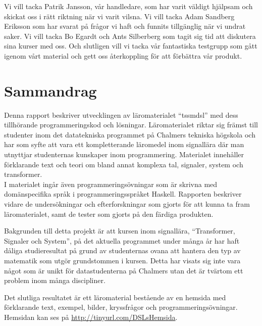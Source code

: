 \documentclass[12pt,a4paper,twoside,openright]{article}
\begin{document}
Vi vill tacka Patrik Jansson, vår handledare, som har varit väldigt
hjälpsam och skickat oss i rätt riktning när vi varit vilsna. Vi vill
tacka Adam Sandberg Eriksson som har svarat på frågor vi haft och
funnits tillgänglig när vi undrat saker. Vi vill tacka Bo Egardt och
Ants Silberberg som tagit sig tid att diskutera sina kurser med
oss. Och slutligen vill vi tacka vår fantastiska testgrupp som gått
igenom vårt material och gett oss återkoppling för att förbättra vår
produkt.

\newpage

\thispagestyle{plain}

\section*{Sammandrag}
Denna rapport beskriver utvecklingen av läromaterialet ``\gls{tssmdsl}''
med dess tillhörande programmeringskod och lösningar. Läromaterialet
riktar sig främst till studenter inom det datatekniska programmet på
Chalmers tekniska högskola och har som syfte att vara ett
kompletterande läromedel inom signallära där man utnyttjar
studenternas kunskaper inom programmering. Materialet innehåller
förklarande text och teori om bland annat komplexa tal, signaler,
system och transformer. \\I materialet ingår även programmeringsövningar
som är skrivna med domänspecifika språk i programmeringsspråket
\gls{Haskell}. Rapporten beskriver vidare de undersökningar och efterforskningar som
gjorts för att kunna ta fram läromaterialet, samt de tester som
gjorts på den färdiga produkten.

Bakgrunden till detta projekt är att kursen inom signallära,
``Transformer, Signaler och System'', på det aktuella programmet under
många år har haft dåliga studieresultat på grund av studenternas ovana
att hantera den typ av matematik som utgör grundstommen i
kursen. Detta har visats sig inte vara något som är unikt för
data\-studenterna på Chalmers utan det är tvärtom ett problem inom många
discipliner.

Det slutliga resultatet är ett läromaterial bestående av en hemsida med
förklarande text, exempel, bilder, kryssfrågor och programmeringsövningar.
Hemsidan kan ses på \url{http://tinyurl.com/DSLsHemsida}.
\end{document}
